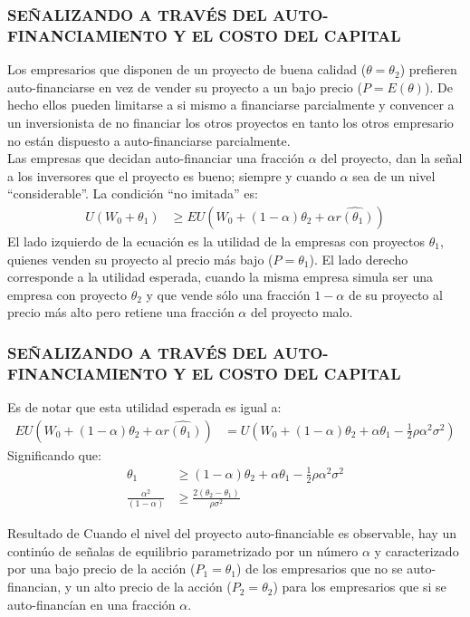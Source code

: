 \documentclass[10pt, xcolor=table, x11names]{beamer}
\begin{document}
\begin{frame}
    \frametitle{{\normalsize SEÑALIZANDO A TRAVÉS DEL AUTO-FINANCIAMIENTO Y EL COSTO DEL CAPITAL} {}}
    Los empresarios que disponen de un proyecto de buena calidad ($\theta=\theta_{2}$) prefieren auto-financiarse en vez de vender su proyecto a un bajo precio ($P=E(\theta)$). De hecho ellos pueden limitarse a si mismo a financiarse parcialmente y convencer a un inversionista de no financiar los otros proyectos en tanto los otros empresario no están dispuesto a auto-financiarse parcialmente.\\
    Las empresas que decidan auto-financiar una fracción $\alpha$ del proyecto, dan la señal a los inversores que el proyecto es bueno; siempre y cuando $\alpha$ sea de un nivel   ``considerable''. La condición  ``no imitada'' es: 
       \begin{align}
      U(W_{0}+\theta_{1})&\geq EU(W_{0}+(1-\alpha)\theta_{2}+\alpha\hat{r(\theta_{1})}) 
      \end{align}  
    El lado izquierdo de la ecuación es la utilidad de la empresas con proyectos $\theta_{1}$, quienes venden su proyecto al precio más bajo ($P=\theta_{1}$). El lado derecho corresponde a la utilidad esperada, cuando la misma empresa simula ser una empresa con proyecto $\theta_{2}$ y que vende sólo una fracción $1-\alpha$ de su proyecto al precio más alto pero retiene una fracción $\alpha$ del proyecto malo. 
    
\end{frame}



\begin{frame}
    \frametitle{{\normalsize SEÑALIZANDO A TRAVÉS DEL AUTO-FINANCIAMIENTO Y EL COSTO DEL CAPITAL} {}}
    
    Es de notar que esta utilidad esperada es igual a:
    \begin{align}
    EU(W_{0}+(1-\alpha)\theta_{2}+\alpha\hat{r(\theta_{1})})&= U(W_{0}+(1-\alpha)\theta_{2}+\alpha\theta_{1}-\frac{1}{2}\rho \alpha^{2} \sigma^{2})
    \end{align}
    Significando que:
     \begin{align}
     \theta_{1}&\geq (1-\alpha)\theta_{2}+\alpha\theta_{1}-\frac{1}{2}\rho \alpha^{2} \sigma^{2} \nonumber \\
     \frac{\alpha^{2}}{(1-\alpha)}&\geq \frac{2(\theta_{2}-\theta_{1})}{\rho \sigma^{2}}
     \end{align} 
      \begin{block} {Resultado de \cite{Leland77}}
         Cuando el nivel del proyecto auto-financiable es observable, hay un continúo de señalas de equilibrio parametrizado por un número $\alpha$ y caracterizado por una bajo precio de la acción ($P_{1}=\theta_{1}$) de los empresarios que no se auto-financian, y un alto precio de la acción ($P_{2}=\theta_{2}$) para los empresarios que si se auto-financían en una fracción $\alpha$.\\      
     \end{block}	
     
      
     
\end{frame}
\end{document}
